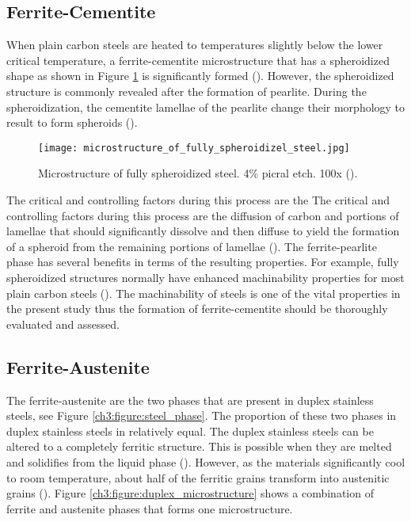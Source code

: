 \subsection{Ferrite-Cementite}
When plain carbon steels are heated to temperatures slightly below the lower critical temperature, a ferrite-cementite microstructure that has a spheroidized shape as shown in Figure \ref{ch3:figure:spheroidized_steel} is significantly formed (\cite{molabe2018determining}). However, the spheroidized structure is commonly revealed after the formation of pearlite. During the spheroidization, the cementite lamellae of the pearlite change their morphology to result to form spheroids (\cite{molabe2018determining}).

\begin{figure}[H]
    \centering
    \texttt{[image: microstructure\_of\_fully\_spheroidizel\_steel.jpg]}
    \caption{Microstructure of fully spheroidized steel. 4\% picral etch. 100x (\cite{molabe2018determining}).}
    \label{ch3:figure:spheroidized_steel}
\end{figure}

The critical and controlling factors during this process are the The critical and controlling factors during this process are the diffusion of carbon and portions of lamellae that should significantly dissolve and then diffuse to yield the formation of a spheroid from the remaining portions of lamellae (\cite{molabe2018determining}). The ferrite-pearlite phase has several benefits in terms of the resulting properties. For example, fully spheroidized structures normally have enhanced machinability properties for most plain carbon steels (\cite{molabe2018determining}).  The machinability of steels is one of the vital properties in the present study thus the formation of ferrite-cementite should be thoroughly evaluated and assessed.

\subsection{Ferrite-Austenite}
The ferrite-austenite are the two phases that are present in duplex stainless steels, see Figure \ref{ch3:figure:steel_phase}. The proportion of these two phases in duplex stainless steels in relatively equal. The duplex stainless steels can be altered to a completely ferritic structure. This is possible when they are melted and solidifies from the liquid phase (\cite{xiao2006challenge}).  However, as the materials significantly cool to room temperature, about half of the ferritic grains transform into austenitic grains (\cite{davison1991guide}). Figure \ref{ch3:figure:duplex_microstructure} shows a combination of ferrite and austenite phases that forms one microstructure.


